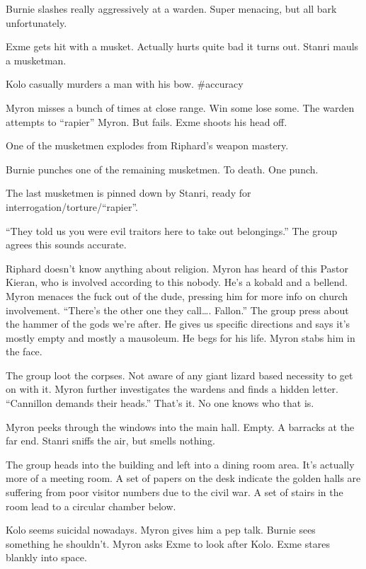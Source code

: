 Burnie slashes really aggressively at a warden. Super menacing, but all bark unfortunately.\medskip

Exme gets hit with a musket. Actually hurts quite bad it turns out. Stanri mauls a musketman.\medskip

Kolo casually murders a man with his bow. \#accuracy\medskip

Myron misses a bunch of times at close range. Win some lose some. The warden attempts to ``rapier'' Myron. But fails. Exme shoots his head off.\medskip

One of the musketmen explodes from Riphard's weapon mastery.\medskip

Burnie punches one of the remaining musketmen. To death. One punch.\medskip

The last musketmen is pinned down by Stanri, ready for interrogation/torture/``rapier''.\medskip

``They told us you were evil traitors here to take out belongings.'' The group agrees this sounds accurate.\medskip

Riphard doesn't know anything about religion. Myron has heard of this Pastor Kieran, who is involved according to this nobody. He's a kobald and a bellend. Myron menaces the fuck out of the dude, pressing him for more info on church involvement. ``There's the other one they call\ldots. Fallon.'' The group press about the hammer of the gods we're after. He gives us specific directions and says it's mostly empty and mostly a mausoleum. He begs for his life. Myron stabs him in the face.\medskip

The group loot the corpses. Not aware of any giant lizard based necessity to get on with it. Myron further investigates the wardens and finds a hidden letter. ``Cannillon demands their heads.'' That's it. No one knows who that is.\medskip

Myron peeks through the windows into the main hall. Empty. A barracks at the far end. Stanri sniffs the air, but smells nothing.\medskip

The group heads into the building and left into a dining room area. It's actually more of a meeting room. A set of papers on the desk indicate the golden halls are suffering from poor visitor numbers due to the civil war. A set of stairs in the room lead to a circular chamber below.\medskip

Kolo seems suicidal nowadays. Myron gives him a pep talk. Burnie sees something he shouldn't. Myron asks Exme to look after Kolo. Exme stares blankly into space.\medskip

